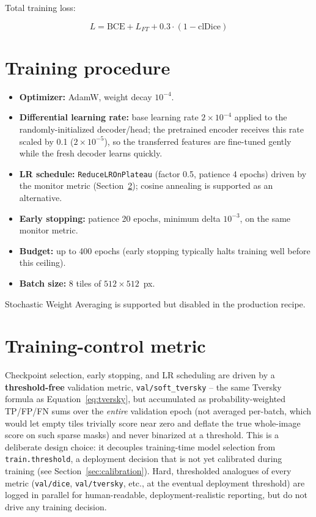 \documentclass[11pt]{article}
\begin{document}
Total training loss:

\begin{equation}
L = \mathrm{BCE} + L_{FT} + 0.3\cdot(1 - \mathrm{clDice})
\label{eq:total-loss}
\end{equation}

\section{Training procedure}

\begin{itemize}[nosep]
  \item \textbf{Optimizer:} AdamW, weight decay $10^{-4}$.
  \item \textbf{Differential learning rate:} base learning rate
        $2\times10^{-4}$ applied to the randomly-initialized decoder/head;
        the pretrained encoder receives this rate scaled by 0.1
        ($2\times10^{-5}$), so the transferred features are fine-tuned
        gently while the fresh decoder learns quickly.
  \item \textbf{LR schedule:} \texttt{ReduceLROnPlateau} (factor 0.5,
        patience 4 epochs) driven by the monitor metric
        (Section~\ref{sec:monitor}); cosine annealing is supported as an
        alternative.
  \item \textbf{Early stopping:} patience 20 epochs, minimum delta
        $10^{-3}$, on the same monitor metric.
  \item \textbf{Budget:} up to 400 epochs (early stopping typically halts
        training well before this ceiling).
  \item \textbf{Batch size:} 8 tiles of $512\times512$~px.
\end{itemize}

Stochastic Weight Averaging is supported but disabled in the production
recipe.

\section{Training-control metric}
\label{sec:monitor}

Checkpoint selection, early stopping, and LR scheduling are driven by a
\textbf{threshold-free} validation metric, \texttt{val/soft\_tversky} -- the
same Tversky formula as Equation~\ref{eq:tversky}, but accumulated as
probability-weighted TP/FP/FN sums over the \emph{entire} validation epoch
(not averaged per-batch, which would let empty tiles trivially score near
zero and deflate the true whole-image score on such sparse masks) and never
binarized at a threshold. This is a deliberate design choice: it decouples
training-time model selection from \texttt{train.threshold}, a deployment
decision that is not yet calibrated during training (see
Section~\ref{sec:calibration}). Hard, thresholded analogues of every metric
(\texttt{val/dice}, \texttt{val/tversky}, etc., at the eventual deployment
threshold) are logged in parallel for human-readable, deployment-realistic
reporting, but do not drive any training decision.
\end{document}
